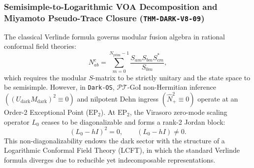 \documentclass[11pt,onecolumn]{article}
\begin{document}
\subsubsection{Semisimple-to-Logarithmic VOA Decomposition and Miyamoto Pseudo-Trace Closure (\texttt{THM-DARK-V8-09})}
\label{subsubsec:thm_dark_v8_09}

The classical Verlinde formula governs modular fusion algebra in rational conformal field theories:
\begin{equation}
N_{ab}^c = \sum_{m=0}^{N_{\text{prim}}-1} \frac{S_{am} S_{bm} S_{cm}^*}{S_{0m}},
\end{equation}
which requires the modular $S$-matrix to be strictly unitary and the state space to be semisimple. However, in \texttt{Dark-OS}, $\mathcal{PT}$-GoI non-Hermitian inference $((U_{\text{dark}} M_{\text{dark}})^2 \equiv 0)$ and nilpotent Dehn ingress $(\hat{N}_+^2 \equiv 0)$ operate at an Order-2 Exceptional Point ($\text{EP}_2$). At $\text{EP}_2$, the Virasoro zero-mode scaling operator $L_0$ ceases to be diagonalizable and forms a rank-2 Jordan block:
\begin{equation}
(L_0 - h I)^2 = 0, \qquad (L_0 - h I) \neq 0.
\end{equation}
This non-diagonalizability endows the dark sector with the structure of a Logarithmic Conformal Field Theory (LCFT), in which the standard Verlinde formula diverges due to reducible yet indecomposable representations.
\end{document}
